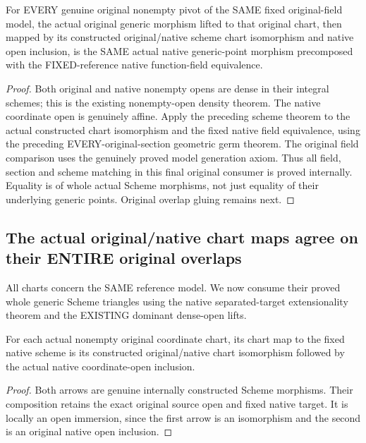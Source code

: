 \begin{theorem}
\label{thm:seven-fixed-original-native-generic-scheme-triangles-route}
\leanok
{}
For EVERY genuine original nonempty pivot of the SAME fixed original-field
model, the actual original generic morphism lifted to that original chart,
then mapped by its constructed original/native scheme chart isomorphism and
native open inclusion, is the SAME actual native generic-point morphism
precomposed with the FIXED-reference native function-field equivalence.
\end{theorem}
\begin{proof}
Both original and native nonempty opens are dense in their integral schemes;
this is the existing nonempty-open density theorem. The native coordinate
open is genuinely affine. Apply the preceding scheme theorem to the actual
constructed chart isomorphism and the fixed native field equivalence, using
the preceding EVERY-original-section geometric germ theorem. The original
field comparison uses the genuinely proved model generation axiom. Thus all
field, section and scheme matching in this final original consumer is proved
internally. Equality is of whole actual Scheme morphisms, not just equality
of their underlying generic points. Original overlap gluing remains next.
\end{proof}

\subsection{The actual original/native chart maps agree on their ENTIRE original overlaps}
All charts concern the SAME reference model. We now consume their proved
whole generic Scheme triangles using the native separated-target
extensionality theorem and the EXISTING dominant dense-open lifts.

\begin{definition}
\label{def:seven-fixed-original-native-chart-maps-route}
\leanok
{}
For each actual nonempty original coordinate chart, its chart map to the
fixed native scheme is its constructed original/native chart isomorphism
followed by the actual native coordinate-open inclusion.
\end{definition}
\begin{proof}
Both arrows are genuine internally constructed Scheme morphisms. Their
composition retains the exact original source open and fixed native target.
It is locally an open immersion, since the first arrow is an isomorphism
and the second is an original native open inclusion.
\end{proof}

